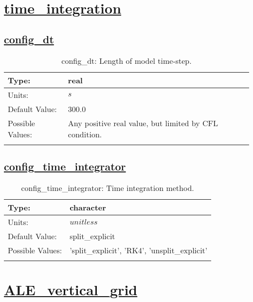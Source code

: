 \section[time\_integration]{\hyperref[sec:nm_tab_time_integration]{time\_integration}}
\label{sec:nm_sec_time_integration}
\subsection[config\_dt]{\hyperref[sec:nm_tab_time_integration]{config\_dt}}
\label{subsec:nm_sec_config_dt}
\begin{center}
\begin{longtable}{| p{2.0in} | p{4.0in} |}
    \hline
    Type: & real \\
    \hline
    Units: & $s$ \\
    \hline
    Default Value: & 300.0 \\
    \hline
    Possible Values: & Any positive real value, but limited by CFL condition. \\
    \hline
    \caption{config\_dt: Length of model time-step.}
\end{longtable}
\end{center}
\subsection[config\_time\_integrator]{\hyperref[sec:nm_tab_time_integration]{config\_time\_integrator}}
\label{subsec:nm_sec_config_time_integrator}
\begin{center}
\begin{longtable}{| p{2.0in} | p{4.0in} |}
    \hline
    Type: & character \\
    \hline
    Units: & $unitless$ \\
    \hline
    Default Value: & split\_explicit \\
    \hline
    Possible Values: & 'split\_explicit', 'RK4', 'unsplit\_explicit' \\
    \hline
    \caption{config\_time\_integrator: Time integration method.}
\end{longtable}
\end{center}
\section[ALE\_vertical\_grid]{\hyperref[sec:nm_tab_ALE_vertical_grid]{ALE\_vertical\_grid}}
\label{sec:nm_sec_ALE_vertical_grid}
